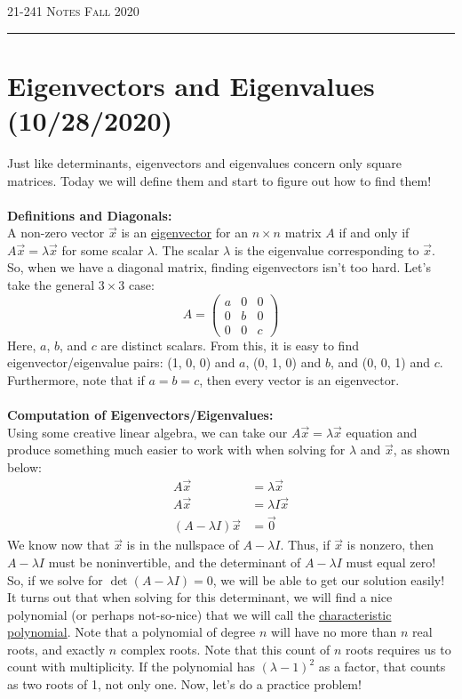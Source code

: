 \documentclass[12pt]{amsart}
\begin{document}
\thispagestyle{empty}

{\scshape 21-241} \hfill {\scshape \Large Notes} \hfill {\scshape Fall 2020}
\medskip
\hrule
\bigskip

\section*{Eigenvectors and Eigenvalues (10/28/2020)}
Just like determinants, eigenvectors and eigenvalues concern only square matrices. Today we will define them and start to figure out how to find them!\\
\\
\textbf{Definitions and Diagonals:}\\
A non-zero vector $\vec{x}$ is an \underline{eigenvector} for an $n \times n$ matrix $A$ if and only if $A\vec{x}=\lambda\vec{x}$ for some scalar $\lambda$. The scalar $\lambda$ is the eigenvalue corresponding to $\vec{x}$.\\
So, when we have a diagonal matrix, finding eigenvectors isn't too hard. Let's take the general $3 \times 3$ case:
\[A = \begin{pmatrix}a&0&0\\0&b&0\\0&0&c\end{pmatrix}\]
Here, $a$, $b$, and $c$ are distinct scalars. From this, it is easy to find eigenvector/eigenvalue pairs: (1, 0, 0) and $a$, (0, 1, 0) and $b$, and (0, 0, 1) and $c$. Furthermore, note that if $a=b=c$, then every vector is an eigenvector.\\
\\
\textbf{Computation of Eigenvectors/Eigenvalues:}\\
Using some creative linear algebra, we can take our $A\vec{x}=\lambda\vec{x}$ equation and produce something much easier to work with when solving for $\lambda$ and $\vec{x}$, as shown below:
\begin{align*}
	A\vec{x} &= \lambda\vec{x}\\
	A\vec{x} &= \lambda I \vec{x}\\
	(A - \lambda I)\vec{x} &= \vec{0}
\end{align*}
We know now that $\vec{x}$ is in the nullspace of $A - \lambda I$. Thus, if $\vec{x}$ is nonzero, then $A - \lambda I$ must be noninvertible, and the determinant of $A - \lambda I$ must equal zero! So, if we solve for $\det (A - \lambda I)=0$, we will be able to get our solution easily!\\
It turns out that when solving for this determinant, we will find a nice polynomial (or perhaps not-so-nice) that we will call the \underline{characteristic polynomial}. Note that a polynomial of degree $n$ will have no more than $n$ real roots, and exactly $n$ complex roots. Note that this count of $n$ roots requires us to count with multiplicity. If the polynomial has $(\lambda - 1)^2$ as a factor, that counts as two roots of 1, not only one. Now, let's do a practice problem!
\end{document}
